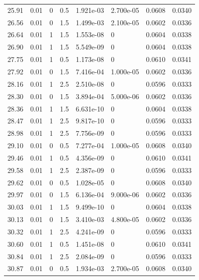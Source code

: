 \documentclass[preview]{standalone}
\begin{document}
{{{{\begin{tabular}{L{1.2cm}C{1.2cm} C{0.3cm}C{0.5cm} C{1.4cm}C{1.4cm} C{1.4cm}C{1.4cm}}
  25.91  &  0.01  & 0     & 0.5 &  1.921e-03  & 2.700e-05  & 0.0608 &  0.0340   \\ 
  26.56  &  0.01  & 0     & 1.5 &  1.499e-03  & 2.100e-05  & 0.0602 &  0.0336   \\ 
  26.64  &  0.01  & 1     & 1.5 &  1.553e-08  & 0  & 0.0604 &  0.0338   \\ 
  26.90  &  0.01  & 1     & 1.5 &  5.549e-09  & 0  & 0.0604 &  0.0338   \\ 
  27.75  &  0.01  & 1     & 0.5 &  1.173e-08  & 0  & 0.0610 &  0.0341   \\ 
  27.92  &  0.01  & 0     & 1.5 &  7.416e-04  & 1.000e-05  & 0.0602 &  0.0336   \\ 
  28.16  &  0.01  & 1     & 2.5 &  2.510e-08  & 0  & 0.0596 &  0.0333   \\ 
  28.30  &  0.01  & 0     & 1.5 &  3.894e-04  & 5.000e-06  & 0.0602 &  0.0336   \\ 
  28.36  &  0.01  & 1     & 1.5 &  6.631e-10  & 0  & 0.0604 &  0.0338   \\ 
  28.47  &  0.01  & 1     & 2.5 &  9.817e-10  & 0  & 0.0596 &  0.0333   \\ 
  28.98  &  0.01  & 1     & 2.5 &  7.756e-09  & 0  & 0.0596 &  0.0333   \\ 
  29.10  &  0.01  & 0     & 0.5 &  7.277e-04  & 1.000e-05  & 0.0608 &  0.0340   \\ 
  29.46  &  0.01  & 1     & 0.5 &  4.356e-09  & 0  & 0.0610 &  0.0341   \\ 
  29.58  &  0.01  & 1     & 2.5 &  2.387e-09  & 0  & 0.0596 &  0.0333   \\ 
  29.62  &  0.01  & 0     & 0.5 &  1.028e-05  & 0  & 0.0608 &  0.0340   \\ 
  29.97  &  0.01  & 0     & 1.5 &  6.136e-04  & 9.000e-06  & 0.0602 &  0.0336   \\ 
  30.03  &  0.01  & 1     & 1.5 &  9.499e-10  & 0  & 0.0604 &  0.0338   \\ 
  30.13  &  0.01  & 0     & 1.5 &  3.410e-03  & 4.800e-05  & 0.0602 &  0.0336   \\ 
  30.32  &  0.01  & 1     & 2.5 &  4.241e-09  & 0  & 0.0596 &  0.0333   \\ 
  30.60  &  0.01  & 1     & 0.5 &  1.451e-08  & 0  & 0.0610 &  0.0341   \\ 
  30.84  &  0.01  & 1     & 2.5 &  2.084e-09  & 0  & 0.0596 &  0.0333   \\ 
  30.87  &  0.01  & 0     & 0.5 &  1.934e-03  & 2.700e-05  & 0.0608 &  0.0340   \\ 

\end{tabular}}}}}
\end{document}
